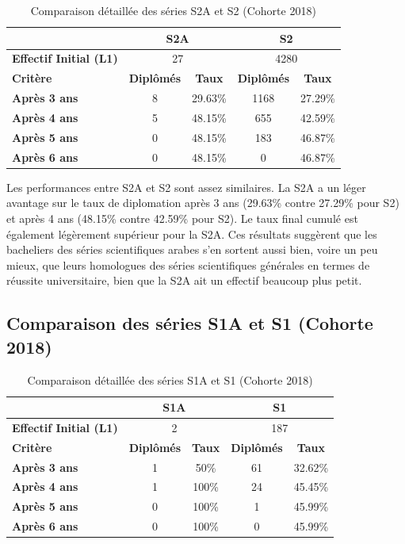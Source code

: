 \begin{table}[htbp]
\centering
\caption{Comparaison détaillée des séries S2A et S2 (Cohorte 2018)}
\begin{tabular}{l|c|c|c|c|}
\cline{2-5}
& \multicolumn{2}{c|}{\textbf{S2A}} & \multicolumn{2}{c|}{\textbf{S2}} \\
\hline
\textbf{Effectif Initial (L1)} & \multicolumn{2}{c|}{27} & \multicolumn{2}{c|}{4280} \\
\hline
\textbf{Critère} & \textbf{Diplômés} & \textbf{Taux} & \textbf{Diplômés} & \textbf{Taux} \\
\hline
\textbf{Après 3 ans} & 8 & 29.63\% & 1168 & 27.29\% \\
\textbf{Après 4 ans} & 5 & 48.15\% & 655 & 42.59\% \\
\textbf{Après 5 ans} & 0 & 48.15\% & 183 & 46.87\% \\
\textbf{Après 6 ans} & 0 & 48.15\% & 0 & 46.87\% \\
\hline
\end{tabular}
\end{table}

Les performances entre S2A et S2 sont assez similaires. La S2A a un léger avantage sur le taux de diplomation après 3 ans (29.63\% contre 27.29\% pour S2) et après 4 ans (48.15\% contre 42.59\% pour S2). 
Le taux final cumulé est également légèrement supérieur pour la S2A. 
Ces résultats suggèrent que les bacheliers des séries scientifiques arabes s'en sortent aussi bien, voire un peu mieux, que leurs homologues des séries scientifiques générales en termes de réussite universitaire, bien que la S2A ait un effectif beaucoup plus petit.

\subsection{Comparaison des séries S1A et S1 (Cohorte 2018)}

\begin{table}[htbp]
\centering
\caption{Comparaison détaillée des séries S1A et S1 (Cohorte 2018)}
\begin{tabular}{l|c|c|c|c|} 
\cline{2-5} 
& \multicolumn{2}{c|}{\textbf{S1A}} & \multicolumn{2}{c|}{\textbf{S1}} \\
\hline
\textbf{Effectif Initial (L1)} & \multicolumn{2}{c|}{2} & \multicolumn{2}{c|}{187} \\
\hline
\textbf{Critère} & \textbf{Diplômés} & \textbf{Taux} & \textbf{Diplômés} & \textbf{Taux} \\
\hline
\textbf{Après 3 ans} & 1 & 50\% & 61 & 32.62\% \\
\textbf{Après 4 ans} & 1 & 100\% & 24 & 45.45\% \\
\textbf{Après 5 ans} & 0 & 100\% & 1 & 45.99\% \\
\textbf{Après 6 ans} & 0 & 100\% & 0 & 45.99\% \\
\hline
\end{tabular}
\end{table}

